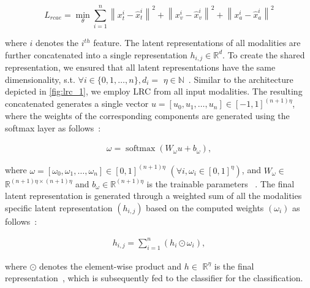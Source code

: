\vspace{-6mm}
\begin{equation}
   L_{rcae} = \min _{\theta} \sum_{i=1}^{n} \left\|x_{t}^{i}-\hat{x}_{t}^{i}\right\|^{2}+\left\|x_{v}^{i}-\hat{x}_{v}^{i}\right\|^{2}+\left\|x_{a}^{i}-\hat{x}_{a}^{i}\right\|^{2}
   \label{eq:recons_loss_2}
\end{equation}

\hspace*{3.5mm} where $i$ denotes the $i^{th}$ feature. The latent representations of all modalities are further concatenated into a single representation $h_{i,j} \in \mathbb{R}^{d}$. To create the shared representation, we ensured that all latent representations have the same dimensionality, s.t. $\forall i \in\{0,1, \ldots, n\}, d_{i}=$ $\eta \in \mathbb{N}$~\cite{mmdcae}. Similar to the architecture depicted in \cref{fig:lrc_1}, we employ LRC from all input modalities. The resulting concatenated generates a single vector $u=\left[u_{0}, u_{1}, \ldots, u_{n}\right] \in[-1,1]^{(n+1) \eta}$, where the weights of the corresponding components are generated using the softmax layer as follows~\cite{mmdcae}:

\vspace{-6mm}
\begin{align}
    \omega=\operatorname{softmax}\left(W_{\omega} u+b_{\omega}\right),
\end{align}

\hspace*{3.5mm} where $\omega=\left[\omega_{0}, \omega_{1}, \ldots, \omega_{n}\right] \in[0,1]^{(n+1) \eta}$ $\left(\forall i, \omega_{i} \in[0,1]^{\eta}\right)$, and  $W_{\omega} \in$ $\mathbb{R}^{(n+1) \eta \times(n+1) \eta}$ and $b_{\omega} \in \mathbb{R}^{(n+1) \eta}$ is the trainable parameters ~\cite{mmdcae}. The final latent representation is generated through a weighted sum of all the modalities specific latent representation $\left(h_{i,j}\right)$ based on the computed weights $\left(\omega_{i}\right)$ as follows~\cite{mmdcae}: 

\vspace{-6mm}
\begin{align}
   h_{i,j}=\sum_{i=1}^{n}\left(h_{i} \odot \omega_{i}\right),
   \label{eq:mcae_latent_final}
\end{align}

\hspace*{3.5mm} where $\odot$ denotes the element-wise product and $h \in$ $\mathbb{R}^{\eta}$ is the final representation~\cite{mmdcae}, which is subsequently fed to the classifier for the classification. 

